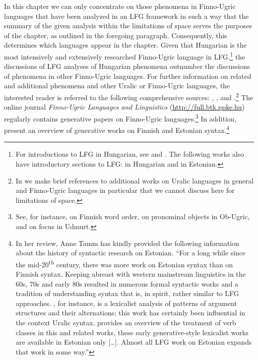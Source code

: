 \documentclass[output=paper,hidelinks]{langscibook}
\begin{document}
In this chapter we can only concentrate on those phenomena in Finno-Ugric languages that have been analyzed in an LFG framework in such a way that the summary of the given analysis within the limitations of space serves the purposes of the chapter, as outlined in the foregoing paragraph. Consequently, this determines which languages appear in the chapter. Given that Hungarian is the most intensively and extensively researched Finno-Ugric language in LFG,\footnote{For introductions to LFG in Hungarian, see \citet{Laczko1989} and \citet{Komlosy2001}. The following works also have introductory sections to LFG: \citet{Szabo2017} in Hungarian and \citet{Tamm2004c} in Estonian.} the discussions of LFG analyses of Hungarian phenomena outnumber the discussions of phenomena in other Finno-Ugric languages. For further information on related and additional phenomena and other Uralic or Finno-Ugric languages, the interested reader is referred to the following comprehensive sources: \citet{Abondolo1998}, \citet{WALS}, \citet{MiestamoTammWagnerNagy2015} and \citet{Groot2017}.\footnote{In  we make brief references to additional works on Uralic languages in general and Finno-Ugric languages in particular that we cannot discuss here for limitations of space.} The online journal \textit{Finno-Ugric Languages and Linguistics} (\url{http://full.btk.ppke.hu}) regularly contains generative papers on Finno-Ugric languages.\footnote{See, for instance, \citet{Brattico2019} on Finnish word order, \citet{Kiss2020} on pronominal objects in Ob-Ugric, and \citet{Asztalos2020} on focus in Udmurt.} In addition, \citet{TammVainikka2018} present an overview of generative works on Finnish and Estonian syntax.\footnote{In her review, Anne Tamm has kindly provided the following information about the history of syntactic research on Estonian. ``For a long while since the mid-20\textsuperscript{th} century, there was more work on Estonian syntax than on Finnish syntax. Keeping abreast with western mainstream linguistics in the 60s, 70s and early 80s resulted in numerous formal syntactic works and a tradition of understanding syntax that is, in spirit, rather similar to LFG approaches. \citet{Ratsep1978}, for instance, is a lexicalist analysis of patterns of argument structures and their alternations; this work has certainly been influential in the context Uralic syntax. \citet{Tamm2012c} provides an overview of the treatment of verb classes in this and related works, these early generative-style lexicalist works are available in Estonian only […]. Almost all LFG work on Estonian expands that work in some way.''}
\end{document}
